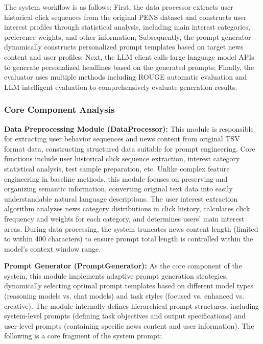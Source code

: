 \documentclass[10pt,a4paper]{article}
\begin{document}
The system workflow is as follows: First, the data processor extracts user historical click sequences from the original PENS dataset and constructs user interest profiles through statistical analysis, including main interest categories, preference weights, and other information; Subsequently, the prompt generator dynamically constructs personalized prompt templates based on target news content and user profiles; Next, the LLM client calls large language model APIs to generate personalized headlines based on the generated prompts; Finally, the evaluator uses multiple methods including ROUGE automatic evaluation and LLM intelligent evaluation to comprehensively evaluate generation results.

\subsubsection{Core Component Analysis}
\textbf{Data Preprocessing Module (DataProcessor):} This module is responsible for extracting user behavior sequences and news content from original TSV format data, constructing structured data suitable for prompt engineering. Core functions include user historical click sequence extraction, interest category statistical analysis, test sample preparation, etc. Unlike complex feature engineering in baseline methods, this module focuses on preserving and organizing semantic information, converting original text data into easily understandable natural language descriptions. The user interest extraction algorithm analyzes news category distributions in click history, calculates click frequency and weights for each category, and determines users' main interest areas. During data processing, the system truncates news content length (limited to within 400 characters) to ensure prompt total length is controlled within the model's context window range.

\vspace{0.5cm}

\textbf{Prompt Generator (PromptGenerator):} As the core component of the system, this module implements adaptive prompt generation strategies, dynamically selecting optimal prompt templates based on different model types (reasoning models vs. chat models) and task styles (focused vs. enhanced vs. creative). The module internally defines hierarchical prompt structures, including system-level prompts (defining task objectives and output specifications) and user-level prompts (containing specific news content and user information). The following is a core fragment of the system prompt:
\end{document}
